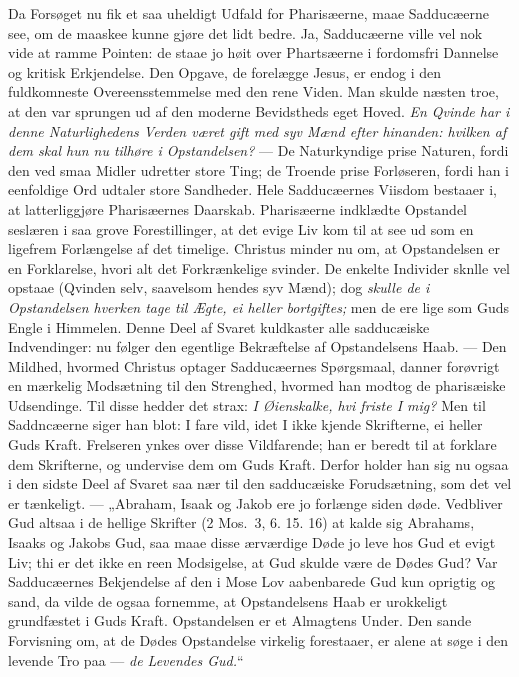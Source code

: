 \documentclass[12pt,a4paper]{book}
\begin{document}
Da Forsøget nu fik et saa uheldigt Udfald for Pharisæerne, maae Sadducæerne see, om de
maaskee kunne gjøre det lidt bedre. Ja, Sadducæerne ville vel nok vide at ramme Pointen: de
staae jo høit over Phartsæerne i fordomsfri Dannelse og kritisk Erkjendelse. Den Opgave, de
forelægge Jesus, er endog i den fuldkomneste Overeensstemmelse med den rene Viden. Man
skulde næsten troe, at den var sprungen ud af den moderne Bevidstheds eget Hoved. \emph{En
Qvinde har i denne Naturlighedens Verden været gift med syv Mænd efter hinanden: hvilken af
dem skal hun nu tilhøre i Opstandelsen?} --- De Naturkyndige prise Naturen, fordi den ved
smaa Midler udretter store Ting; de Troende prise Forløseren, fordi han i eenfoldige Ord
udtaler store Sandheder. Hele Sadducæernes Viisdom bestaaer i, at latterliggjøre
Pharisæernes Daarskab. Pharisæerne indklædte Opstandel\-%
seslæren i saa grove Forestillinger, at det evige Liv kom til at see ud som en ligefrem
Forlængelse af det timelige. Christus minder nu om, at Opstandelsen er en Forklarelse,
hvori alt det Forkrænkelige svinder. De enkelte Individer sknlle vel opstaae (Qvinden selv,
saavelsom hendes syv Mænd); dog \emph{skulle de i Opstandelsen hverken tage til Ægte, ei
heller bortgiftes;} men {\large de ere lige som Guds Engle i Himmelen.} Denne Deel af
Svaret kuldkaster alle sadducæiske Indvendinger: nu følger den egentlige Bekræftelse af
Opstandelsens Haab. --- Den Mildhed, hvormed Christus optager Sadducæernes Spørgsmaal,
danner forøvrigt en mærkelig Modsætning til den Strenghed, hvormed han modtog de
pharisæiske Udsendinge. Til disse hedder det strax: \emph{I Øienskalke, hvi friste I mig?}
Men til Saddncæerne siger han blot: {\large I fare vild, idet I ikke kjende Skrifterne, ei
heller Guds Kraft.} Frelseren ynkes over disse Vildfarende; han er beredt til at forklare
dem Skrifterne, og undervise dem om Guds Kraft. Derfor holder han sig nu ogsaa i den sidste
Deel af Svaret saa nær til den sadducæiske Forudsætning, som det vel er tænkeligt. ---
„Abraham, Isaak og Jakob ere jo forlænge siden døde. Vedbliver Gud altsaa i de hellige
Skrifter (2 Mos.\ 3, 6. 15. 16) at kalde sig Abrahams, Isaaks og Jakobs Gud, saa maae disse
ærværdige Døde jo leve hos Gud et evigt Liv; thi er det ikke en reen Modsigelse, at Gud
skulde være de Dødes Gud? Var Sadducæernes Bekjendelse af den i Mose Lov aabenbarede Gud
kun oprigtig og sand, da vilde de ogsaa fornemme, at Opstandelsens Haab er urokkeligt
grundfæstet i Guds Kraft. Opstandelsen er et Almagtens Under. Den sande Forvisning om, at
de Dødes Opstandelse virkelig forestaaer, er alene at søge i den levende Tro paa ---
\emph{de Levendes Gud.}“
\end{document}
